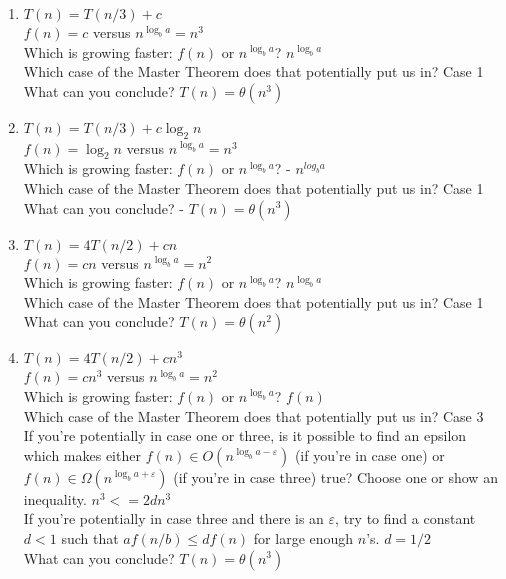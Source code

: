 \documentclass[12 pt]{amsart}
\renewcommand{\epsilon}{\varepsilon}
\begin{document}
\begin{enumerate}[label=\arabic*.)]

	\item $T(n) = T(n/3) + c$ \\
	$f(n) = c$ versus $n^{\log_b a} = n^{3}$ \\
	Which is growing faster: $f(n)$ or  $n^{\log_b a}$?     $n^{\log_b a}$ \\
	Which case of the Master Theorem does that potentially put us in?     Case 1 \\
	What can you conclude?     $T(n) = \theta(n^{3})$
	
	\bigskip
	
	\item $T(n) = T(n/3) + c\log_2 n$ \\
	$f(n) = \log_2 n$ versus $n^{\log_b a} = n^{3}$ \\
	Which is growing faster: $f(n)$ or  $n^{\log_b a}$?  - $n^{log_b a}$ \\
	Which case of the Master Theorem does that potentially put us in?     Case 1 \\
	What can you conclude?  - $T(n) = \theta(n^{3})$
	
	\bigskip
	
	\item $T(n) = 4T(n/2) + cn$ \\
	$f(n) = cn$ versus $n^{\log_b a} = n^{2}$ \\
	Which is growing faster: $f(n)$ or  $n^{\log_b a}$?     $n^{\log_b a}$ \\
	Which case of the Master Theorem does that potentially put us in?     Case 1 \\
	What can you conclude?      $T(n) = \theta(n^{2})$
	
	\bigskip
	
	\item $T(n) = 4T(n/2) + cn^3$ \\
	$f(n) = cn^{3}$ versus $n^{\log_b a} = n^{2}$ \\
	Which is growing faster: $f(n)$ or  $n^{\log_b a}$?     $f(n)$\\
	Which case of the Master Theorem does that potentially put us in?     Case 3 \\
	If you're potentially in case one or three, is it possible to find an epsilon which makes either $f(n) \in O(n^{\log_b a - \epsilon})$ (if you're in case one) or $f(n) \in \Omega(n^{\log_b a+ \epsilon})$ (if you're in case three) true? Choose one or show an inequality.    $n^{3} <= 2dn^{3}$ \\
	If you're potentially in case three and there is an $\epsilon$, try to find a constant $d<1$ such that $a f(n/b) \leq d f(n)$ for large enough $n$'s.
	    $d = 1/2$ \\
	What can you conclude?      $T(n) = \theta(n^{3})$
	

\end{enumerate}
\end{document}
